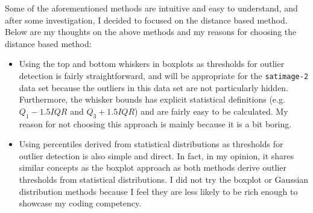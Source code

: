 \documentclass[12pt]{article}
\begin{document}
Some of the aforementioned methods are intuitive and easy to understand, and after some investigation, I decided to 
focused on the distance based method.
Below are my thoughts on the above methods and my reasons for choosing the distance based method:
\vspace{-1.5ex}
\begin{itemize}
	\itemsep0em
	\item {Using the top and bottom whiskers in boxplots as thresholds for outlier detection is 
	fairly straightforward, and will be appropriate for the \texttt{satimage-2} data set because the outliers in this data set are not particularly hidden.
	Furthermore, the whisker bounds has explicit statistical definitions (e.g. $Q_1-1.5IQR$ and $Q_3+1.5IQR$) and are fairly easy to be calculated.}
	My reason for not choosing this approach is mainly because it is a bit boring.
	
	\item {Using percentiles derived from statistical distributions as thresholds for outlier 
	detection is also simple and direct. In fact, in my opinion, it shares similar 
	concepts as the boxplot approach as both methods derive outlier thresholds from statistical distributions.
	I did not try the boxplot or Gaussian distribution methods because I feel they are less likely to be rich enough
	to showcase my coding competency.}
	

\end{itemize}
\end{document}
